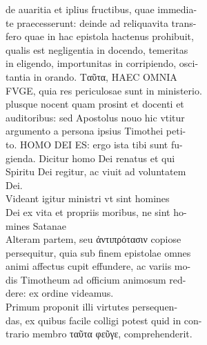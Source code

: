 \documentclass{article}
\begin{document}
\begin{pages}
                de auaritia et iplius fructibus, quae immedia- \\
                te praecesserunt: deinde ad reliquavita trans- \\
                fero quae in hac epistola hactenus prohibuit, \\
                qualis est negligentia in docendo, temeritas \\
                in eligendo, importunitas in corripiendo, osci- \\
                tantia in orando. Ταῦτα, HAEC OMNIA \\
                FVGE, quia res periculosae sunt in ministerio. \\
                plusque nocent quam prosint et docenti et \\
                auditoribus: sed Apostolus nouo hic vtitur \\
                argumento a persona ipsius Timothei peti- \\
                to. HOMO DEI ES: ergo ista tibi sunt fu- \\
                gienda. Dicitur homo Dei renatus et qui \\
                Spiritu Dei regitur, ac viuit ad voluntatem \\
                Dei. \\
                Videant igitur ministri vt sint homines \\
                Dei ex vita et propriis moribus, ne sint ho- \\
                mines Satanae \\
                Alteram partem, seu ἀντιπρότασιν copiose \\
                persequitur, quia sub finem epistolae omnes \\
                animi affectus cupit effundere, ac variis mo- \\
                dis Timotheum ad officium animosum red- \\
                dere: ex ordine videamus. \\
                Primum proponit illi virtutes persequen- \\
                das, ex quibus facile colligi potest quid in con- \\
                trario membro ταῦτα φεῦγε, comprehenderit. \\
\end{pages}
\end{document}
